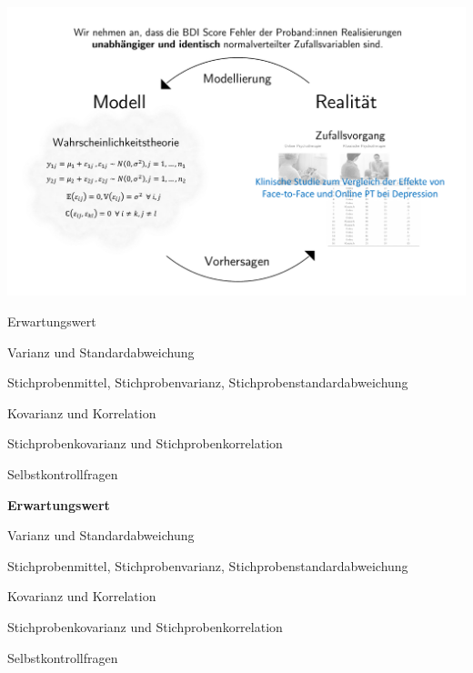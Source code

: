 \documentclass[
  8pt,
  ignorenonframetext,
]{beamer}
\begin{document}
\begin{frame}{}
\protect\hypertarget{section-3}{}
\begin{center}\includegraphics[width=1\linewidth]{6_Abbildungen/wtfi_6_wahrscheinlichkeitstheorie_modell_beispiel} \end{center}
\end{frame}

\begin{frame}{}
\protect\hypertarget{section-4}{}
\large
\vfill

Erwartungswert

Varianz und Standardabweichung

Stichprobenmittel, Stichprobenvarianz, Stichprobenstandardabweichung

Kovarianz und Korrelation

Stichprobenkovarianz und Stichprobenkorrelation

Selbstkontrollfragen \vfill
\end{frame}

\begin{frame}{}
\protect\hypertarget{section-5}{}
\large
\vfill

\textbf{Erwartungswert}

Varianz und Standardabweichung

Stichprobenmittel, Stichprobenvarianz, Stichprobenstandardabweichung

Kovarianz und Korrelation

Stichprobenkovarianz und Stichprobenkorrelation

Selbstkontrollfragen \vfill
\end{frame}
\end{document}
